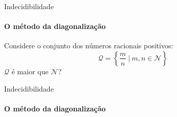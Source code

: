 \documentclass{beamer}
\begin{document}
\begin{frame}{Indecidibilidade}
	\framesubtitle{O método da diagonalização}
	Considere o conjunto dos números racionais positivos:
	\begin{equation*}
		\mathscr{Q} = \left\{\frac{m}{n}\ |\ m,n \in \mathscr{N} \right\}
	\end{equation*}
	$\mathscr{Q}$ é maior que $\mathscr{N}$?
\end{frame}
\begin{frame}{Indecidibilidade}
	\framesubtitle{O método da diagonalização}
	\begin{figure}

\end{figure}
\end{frame}
\end{document}
